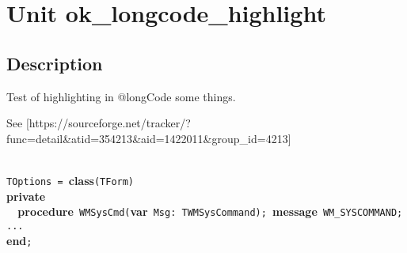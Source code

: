 \documentclass{report}
\begin{document}
\newlength{\tmplength}
\chapter{Unit ok{\_}longcode{\_}highlight}
\section{Description}
Test of highlighting in @longCode some things.\hfill\vspace*{1ex}



See [https://sourceforge.net/tracker/?func=detail{\&}atid=354213{\&}aid=1422011{\&}group{\_}id=4213]

\texttt{\\\nopagebreak[3]
TOptions~=~}\textbf{class}\texttt{(TForm)\\\nopagebreak[3]
}\textbf{private}\texttt{\\\nopagebreak[3]
~~}\textbf{procedure}\texttt{~WMSysCmd(}\textbf{var}\texttt{~Msg:~TWMSysCommand);~}\textbf{message}\texttt{~WM{\_}SYSCOMMAND;\\\nopagebreak[3]
...\\\nopagebreak[3]
}\textbf{end}\texttt{;\\
}
\end{document}
